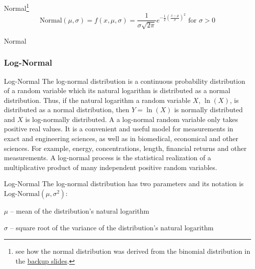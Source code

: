 \begin{frame}{Normal\footnote{
			see how the normal distribution was derived from the binomial
			distribution in the \hyperlink{appendixnormal}{backup slides}.}}
	$$\text{Normal}(\mu,\sigma) = f(x, \mu, \sigma) = \frac{1}{\sigma{\sqrt{2\pi }}}e^{-{\frac{1}{2}}\left({\frac {x-\mu }{\sigma }}\right)^{2}} \text{ for $\sigma > 0$}$$
\end{frame}

\begin{frame}{Normal}
	\centering
\end{frame}

\subsubsection{Log-Normal}
\begin{frame}{Log-Normal}
	The log-normal distribution is a continuous probability distribution of a
	random variable which its natural logarithm is distributed as a normal distribution.
	Thus, if the natural logarithm a random variable $X$, $\ln(X)$, is distributed
	as a normal distribution, then $Y = \ln(X)$ is normally distributed and
	$X$ is log-normally distributed.
	\vfill
	A a log-normal random variable only takes positive real values.
	It is a convenient and useful model for measurements in exact and engineering
	sciences, as well as in biomedical, economical and other sciences.
	For example, energy, concentrations, length, financial returns and other measurements.
	\vfill
	A log-normal process is the statistical realization of a multiplicative
	product of many independent positive random variables.
\end{frame}

\begin{frame}{Log-Normal}
	The log-normal distribution has two parameters and its notation is
	$\text{Log-Normal}(\mu, \sigma^2)$:
	\begin{vfilleditems}
		\item $\mu$ -- mean of the distribution's natural logarithm
		\item $\sigma$ -- square root of the variance of the distribution's natural logarithm
	\end{vfilleditems}
\end{frame}

